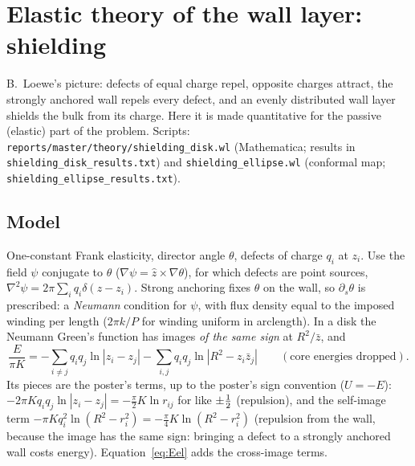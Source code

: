 \section{Elastic theory of the wall layer: shielding}\label{sec:theory}
B.~Loewe's picture: defects of equal charge repel, opposite charges attract, the strongly anchored wall repels every defect, and an evenly
distributed wall layer shields the bulk from its charge. Here it is made quantitative for the passive (elastic) part of the problem.
Scripts: \texttt{reports/master/theory/shielding\_disk.wl} (Mathematica; results in \texttt{shielding\_disk\_results.txt}) and
\texttt{shielding\_ellipse.wl} (conformal map; \texttt{shielding\_ellipse\_results.txt}).

\subsection{Model}
One-constant Frank elasticity, director angle $\theta$, defects of charge $q_i$ at $z_i$. Use the field $\psi$ conjugate to $\theta$
($\nabla\psi=\hat z\times\nabla\theta$), for which defects are point sources, $\nabla^2\psi=2\pi\sum_iq_i\delta(z-z_i)$. Strong anchoring fixes
$\theta$ on the wall, so $\partial_s\theta$ is prescribed: a \emph{Neumann} condition for $\psi$, with flux density equal to the imposed winding per
length ($2\pi k/P$ for winding uniform in arclength). In a disk the Neumann Green's function has images \emph{of the same sign} at $R^2/\bar z$, and
\begin{equation}
\frac{E}{\pi K}=-\sum_{i\ne j}q_iq_j\ln|z_i-z_j|-\sum_{i,j}q_iq_j\ln|R^2-z_i\bar z_j|\qquad(\text{core energies dropped}).
\label{eq:Eel}
\end{equation}
Its pieces are the poster's terms, up to the poster's sign convention ($U=-E$): $-2\pi Kq_iq_j\ln|z_i-z_j|=-\frac\pi2K\ln r_{ij}$ for like $\pm\tfrac12$
(repulsion), and the self-image term $-\pi Kq_i^2\ln(R^2-r_i^2)=-\frac\pi4K\ln(R^2-r_i^2)$ (repulsion from the wall, because the image has the same
sign: bringing a defect to a strongly anchored wall costs energy). Equation~\eqref{eq:Eel} adds the cross-image terms.

